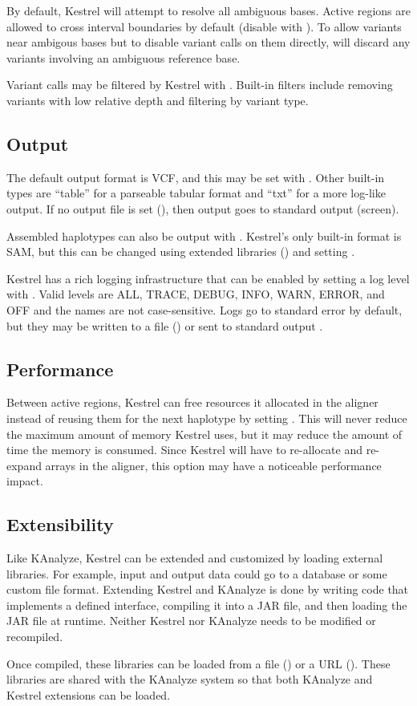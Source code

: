 By default, Kestrel will attempt to resolve all ambiguous bases. Active regions are allowed to cross interval boundaries by default (disable with ). To allow variants near ambigous bases but to disable variant calls on them directly,  will discard any variants involving an ambiguous reference base.

Variant calls may be filtered by Kestrel with . Built-in filters include removing variants with low relative depth and filtering by variant type.


\subsection{Output}
\label{sec.process.output}

The default output format is VCF, and this may be set with . Other built-in types are ``table'' for a parseable tabular format and ``txt'' for a more log-like output. If no output file is set (), then output goes to standard output (screen).

Assembled haplotypes can also be output with . Kestrel's only built-in format is SAM, but this can be changed using extended libraries () and setting .

Kestrel has a rich logging infrastructure that can be enabled by setting a log level with . Valid levels are ALL, TRACE, DEBUG, INFO, WARN, ERROR, and OFF and the names are not case-sensitive. Logs go to standard error by default, but they may be written to a file () or sent to standard output .

\subsection{Performance}
\label{sec.process.perf}

Between active regions, Kestrel can free resources it allocated in the aligner instead of reusing them for the next haplotype by setting . This will never reduce the maximum amount of memory Kestrel uses, but it may reduce the amount of time the memory is consumed. Since Kestrel will have to re-allocate and re-expand arrays in the aligner, this option may have a noticeable performance impact.

\subsection{Extensibility}
\label{sec.process.libs}

Like KAnalyze, Kestrel can be extended and customized by loading external libraries. For example, input and output data could go to a database or some custom file format. Extending Kestrel and KAnalyze is done by writing code that implements a defined interface, compiling it into a JAR file, and then loading the JAR file at runtime. Neither Kestrel nor KAnalyze needs to be modified or recompiled.

Once compiled, these libraries can be loaded from a file () or a URL (). These libraries are shared with the KAnalyze system so that both KAnalyze and Kestrel extensions can be loaded.
